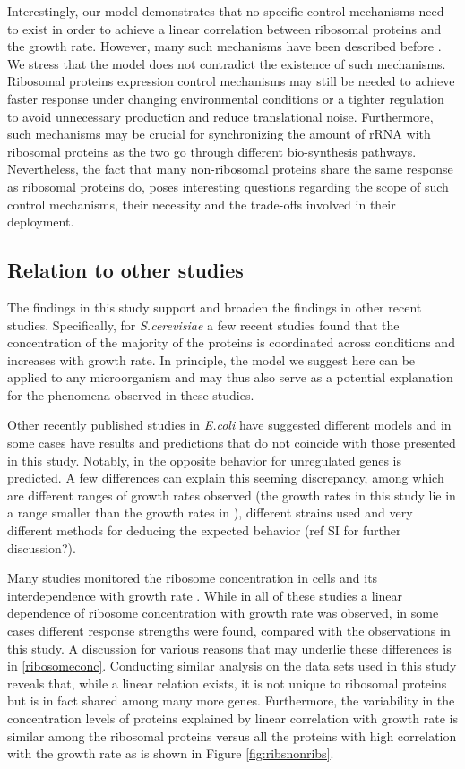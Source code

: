 Interestingly, our model demonstrates that no specific control mechanisms need to exist in order to achieve a linear correlation between ribosomal proteins and the growth rate.
However, many such mechanisms have been described before \cite{Nomura1984}.
We stress that the model does not contradict the existence of such mechanisms.
Ribosomal proteins expression control mechanisms may still be needed to achieve faster response under changing environmental conditions or a tighter regulation to avoid unnecessary production and reduce translational noise.
Furthermore, such mechanisms may be crucial for synchronizing the amount of rRNA with ribosomal proteins as the two go through different bio-synthesis pathways.
Nevertheless, the fact that many non-ribosomal proteins share the same response as ribosomal proteins do, poses interesting questions regarding the scope of such control mechanisms, their necessity and the trade-offs involved in their deployment.

\subsection{Relation to other studies}
The findings in this study support and broaden the findings in other recent studies.
Specifically, for \emph{S.cerevisiae} a few recent studies found that the concentration of the majority of the proteins is coordinated across conditions \cite{Keren2013a,Gasch2000,Brauer2008a} and increases with growth rate.
In principle, the model we suggest here can be applied to any microorganism and may thus also serve as a potential explanation for the phenomena observed in these studies.


Other recently published studies in \emph{E.coli} have suggested different models and in some cases have results  and predictions that do not coincide with those presented in this study.
Notably, in \cite{Klumpp2009a} the opposite behavior for unregulated genes is predicted.
A few differences can explain this seeming discrepancy, among which are different ranges of growth rates observed (the growth rates in this study lie in a range smaller than the growth rates in \cite{Klumpp2009a}), different strains used and very different methods for deducing the expected behavior (ref SI for further discussion?).


Many studies monitored the ribosome concentration in cells and its interdependence with growth rate \cite{Scott2010,Bremer1987,Schaechter1958,1974,Zaslaver2009,Bremer1987}.
While in all of these studies a linear dependence of ribosome concentration with growth rate was observed, in some cases different response strengths were found, compared with the observations in this study.
A discussion for various reasons that may underlie these differences is in \ref{ribosomeconc}.
Conducting similar analysis on the data sets used in this study reveals that, while a linear relation exists, it is not unique to ribosomal proteins but is in fact shared among many more genes.
Furthermore, the variability in the concentration levels of proteins explained by linear correlation with growth rate is similar among the ribosomal proteins versus all the proteins with high correlation with the growth rate as is shown in Figure \ref{fig:ribsnonribs}.

